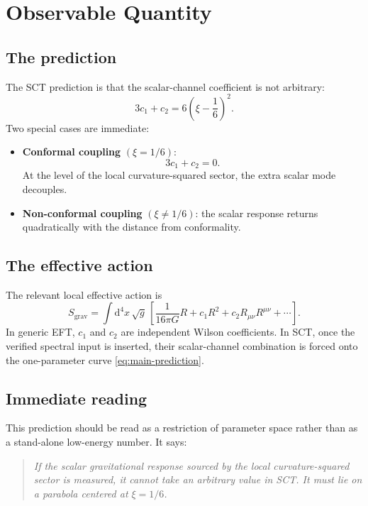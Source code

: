 \documentclass[11pt,a4paper]{article}
\newcommand{\dd}{\mathrm{d}}
\begin{document}
\section{Observable Quantity}
\label{sec:observable}

\subsection{The prediction}

The SCT prediction is that the scalar-channel coefficient is not arbitrary:
\begin{equation}
  \boxed{
    3c_1 + c_2
    = 6\left(\xi - \frac{1}{6}\right)^2.
  }
  \label{eq:main-prediction}
\end{equation}
Two special cases are immediate:
\begin{itemize}
  \item \textbf{Conformal coupling} $(\xi = 1/6)$:
  \begin{equation}
    3c_1 + c_2 = 0.
    \label{eq:conformal-decoupling}
  \end{equation}
  At the level of the local curvature-squared sector, the extra scalar mode
  decouples.
  \item \textbf{Non-conformal coupling} $(\xi \neq 1/6)$:
  the scalar response returns quadratically with the distance from
  conformality.
\end{itemize}

\subsection{The effective action}

The relevant local effective action is
\begin{equation}
  S_{\mathrm{grav}}
  = \int \dd^4x\,\sqrt{g}\,
  \left[
    \frac{1}{16\pi G}R
    + c_1R^2
    + c_2R_{\mu\nu}R^{\mu\nu}
    + \cdots
  \right].
  \label{eq:effective-action}
\end{equation}
In generic EFT, $c_1$ and $c_2$ are independent Wilson coefficients.
In SCT, once the verified spectral input is inserted, their scalar-channel
combination is forced onto the one-parameter curve \eqref{eq:main-prediction}.

\subsection{Immediate reading}

This prediction should be read as a restriction of parameter space rather
than as a stand-alone low-energy number.  It says:
\begin{quote}
\emph{If the scalar gravitational response sourced by the local
curvature-squared sector is measured, it cannot take an arbitrary value in
SCT.  It must lie on a parabola centered at $\xi = 1/6$.}
\end{quote}
\end{document}
